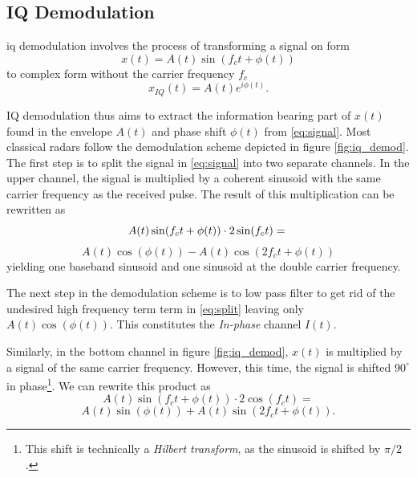 
\begin{appendices}

\chapter{IQ Demodulation}\label{apx:iq}

\gls{iq} demodulation involves the process of transforming a signal on form 
\begin{equation}\label{eq:signal}
	x(t)=A(t)\sin(f_c t+\phi(t))
\end{equation}
to complex form without the carrier frequency $f_c$ \citep{lee_1991}
\begin{equation}
	x_{IQ}(t) = A(t)e^{i\phi(t)}.
\end{equation}
	
IQ demodulation thus aims to extract the information bearing part of $x(t)$ found in the envelope $A(t)$ and phase shift $\phi(t)$ from \eqref{eq:signal}. Most classical radars follow the demodulation scheme depicted in figure \ref{fig:iq_demod}. The first step is to split the signal in \eqref{eq:signal} into two separate channels. In the upper channel, the signal is multiplied by a coherent sinusoid with the same carrier frequency as the received pulse. The result of this multiplication can be rewritten as
\begin{equation}
	 A(t)\sin(f_c t+\phi(t))\cdot 2\sin(f_c t) = \\
\end{equation}
\begin{equation}\label{eq:split}
	A(t)\cos(\phi(t))-A(t)\cos(2f_c t+\phi(t))
\end{equation}
yielding one baseband sinusoid and one sinusoid at the double carrier frequency. 

The next step in the demodulation scheme is to low pass filter to get rid of the undesired high frequency term term in \eqref{eq:split} leaving only $A(t)\cos(\phi(t))$. This constitutes the \emph{In-phase} channel $I(t)$.

	Similarly, in the bottom channel in figure \ref{fig:iq_demod}, $x(t)$ is multiplied by a signal of the same carrier frequency. However, this time, the signal is shifted $90^\circ$ in phase\footnote{This shift is technically a \emph{Hilbert transform}, as the sinusoid is shifted by $\pi/2$.}. We can rewrite this product as
\begin{equation}
	 A(t)\sin(f_c t+\phi(t))\cdot 2\cos(f_c t) = 
\end{equation}
\begin{equation}\label{eq:split2}
 	 A(t)\sin(\phi(t))+A(t)\sin(2f_c t+\phi(t)).
\end{equation}


\end{appendices}

